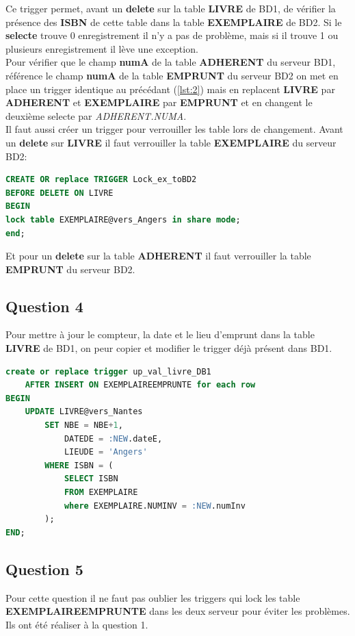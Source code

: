 \documentclass{article}
\begin{document}
Ce trigger permet, avant un \textbf{delete} sur la table \textbf{LIVRE} de BD1, de vérifier la présence des \textbf{ISBN} de cette table dans la table \textbf{EXEMPLAIRE} de BD2. Si le \textbf{selecte} %
trouve 0 enregistrement il n'y a pas de problème, mais si il trouve 1 ou plusieurs enregistrement il lève une exception. 
\\

Pour vérifier que le champ \textbf{numA} de la table \textbf{ADHERENT} du serveur BD1, référence le champ \textbf{numA} de la table \textbf{EMPRUNT} du serveur BD2 on met en place un trigger identique au précédant (\ref{lst:2}) mais en replacent \textbf{LIVRE} par \textbf{ADHERENT} et \textbf{EXEMPLAIRE} par \textbf{EMPRUNT} et en changent le deuxième selecte par \textit{ADHERENT.NUMA}.
\\

Il faut aussi créer un trigger pour verrouiller les table lors de changement.
Avant un \textbf{delete} sur \textbf{LIVRE} il faut verrouiller la table \textbf{EXEMPLAIRE} du serveur BD2:
\begin{lstlisting}[language=SQL, caption= Trigger: lock exemplaire]
CREATE OR replace TRIGGER Lock_ex_toBD2
BEFORE DELETE ON LIVRE
BEGIN
lock table EXEMPLAIRE@vers_Angers in share mode;
end;
\end{lstlisting}
Et pour un \textbf{delete} sur la table \textbf{ADHERENT} il faut verrouiller la table \textbf{EMPRUNT} du serveur BD2.


\subsection{Question 4}
Pour mettre à jour le compteur, la date et le lieu d'emprunt
dans la table \textbf{LIVRE} de BD1, on peur copier et modifier le trigger déjà présent dans BD1.
\begin{lstlisting}[language=SQL, caption= Trigger: mise à jour des valeur de livre]
create or replace trigger up_val_livre_DB1
    AFTER INSERT ON EXEMPLAIREEMPRUNTE for each row
BEGIN
    UPDATE LIVRE@vers_Nantes
        SET NBE = NBE+1,
            DATEDE = :NEW.dateE,
            LIEUDE = 'Angers'
        WHERE ISBN = (
            SELECT ISBN 
            FROM EXEMPLAIRE 
            where EXEMPLAIRE.NUMINV = :NEW.numInv 
        );
END;
\end{lstlisting}


\subsection{Question 5}
Pour cette question il ne faut pas oublier les triggers qui lock les table \textbf{EXEMPLAIREEMPRUNTE} dans les deux serveur pour éviter les problèmes.
Ils ont été réaliser à la question 1.
\\
\end{document}
